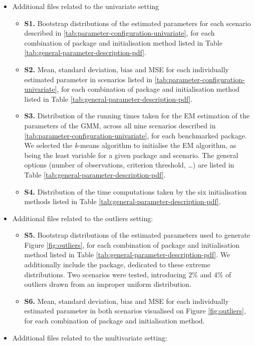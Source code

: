 \begin{itemize}
\item
  Additional files related to the univariate setting

  \begin{itemize}
  \tightlist
  \item
    \textbf{S1.} Bootstrap distributions of the estimated parameters for each
    scenario described in \ref{tab:parameter-configuration-univariate}, for each
    combination of package and initialisation method listed in Table \ref{tab:general-parameter-description-pdf}.
  \item
    \textbf{S2.} Mean, standard deviation, bias and MSE for each individually
    estimated parameter in scenarios listed in \ref{tab:parameter-configuration-univariate}, for each
    combination of package and initialisation method listed in Table \ref{tab:general-parameter-description-pdf}.
  \item
    \textbf{S3.} Distribution of the running times taken for the EM estimation of the parameters of the GMM, across all nine scenarios described in \ref{tab:parameter-configuration-univariate}, for each benchmarked package. We selected the \emph{k}-means algorithm to initialise the EM algorithm, as being the least variable for a given package and scenario. The general options (number of observations, criterion threshold, \ldots) are listed in Table \ref{tab:general-parameter-description-pdf}.
  \item
    \textbf{S4.} Distribution of the time computations taken by the six initialisation methods listed in Table \ref{tab:general-parameter-description-pdf}.
  \end{itemize}
\item
  Additional files related to the outliers setting:

  \begin{itemize}
  \tightlist
  \item
    \textbf{S5.} Bootstrap distributions of the estimated parameters used to
    generate Figure \ref{fig:outliers}, for each combination of package
    and initialisation method listed in Table \ref{tab:general-parameter-description-pdf}. We additionally include the  package, dedicated to these extreme distributions. Two scenarios were tested, introducing \(2 \%\) and \(4 \%\) of outliers drawn from an improper uniform distribution.
  \item
    \textbf{S6.} Mean, standard deviation, bias and MSE for each individually
    estimated parameter in both scenarios visualised on Figure
    \ref{fig:outliers}, for each combination of package and
    initialisation method.
  \end{itemize}
\item
  Additional files related to the multivariate setting:


\end{itemize}
